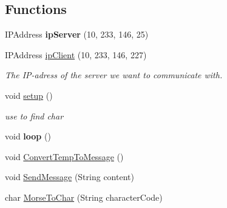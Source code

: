 \subsection*{Functions}
\begin{DoxyCompactItemize}
\item 
\mbox{\label{_arduino_morse_client_8ino_a003cf3759c7112d1d239a549ed433104}} 
I\+P\+Address {\bfseries ip\+Server} (10, 233, 146, 25)
\item 
\mbox{\label{_arduino_morse_client_8ino_ab6ef01eb8f7bbc92bc655ddf6f2095b8}} 
I\+P\+Address \mbox{\hyperlink{_arduino_morse_client_8ino_ab6ef01eb8f7bbc92bc655ddf6f2095b8}{ip\+Client}} (10, 233, 146, 227)
\begin{DoxyCompactList}\small\item\em The I\+P-\/adress of the server we want to communicate with. \end{DoxyCompactList}\item 
void \mbox{\hyperlink{_arduino_morse_client_8ino_a4fc01d736fe50cf5b977f755b675f11d}{setup}} ()
\begin{DoxyCompactList}\small\item\em use to find char \end{DoxyCompactList}\item 
\mbox{\label{_arduino_morse_client_8ino_afe461d27b9c48d5921c00d521181f12f}} 
void {\bfseries loop} ()
\item 
void \mbox{\hyperlink{_arduino_morse_client_8ino_a1fe60c5a5dee3af1ed1e0cf380175333}{Convert\+Temp\+To\+Message}} ()
\item 
void \mbox{\hyperlink{_arduino_morse_client_8ino_a4b40eed9d26071a1abd196858475cb7e}{Send\+Message}} (String content)
\item 
char \mbox{\hyperlink{_arduino_morse_client_8ino_a3c352a3078a48318473305aa369f8c5f}{Morse\+To\+Char}} (String character\+Code)
\end{DoxyCompactItemize}
